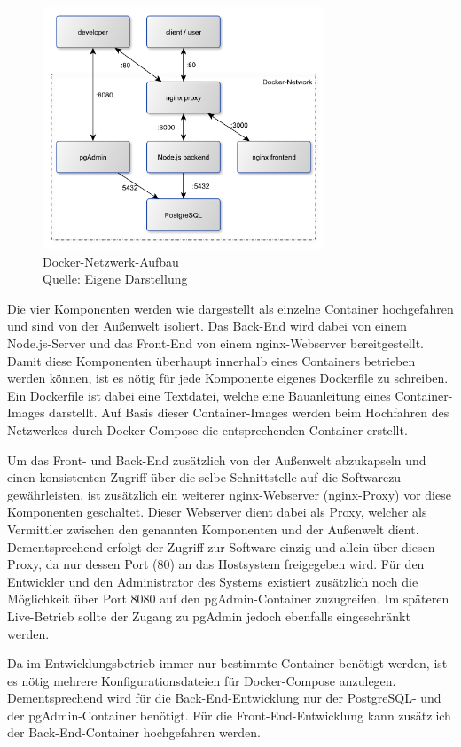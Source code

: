 \begin{figure}[H]
	\centering
	\includegraphics[width=0.75\textwidth]{img/implementierung/network.pdf}
	\captionsetup{justification=centering, format=plain}
	\caption[Docker-Netzwerk-Aufbau]{Docker-Netzwerk-Aufbau \\Quelle: Eigene Darstellung}
	\label{fig:implementierung:docker}
\end{figure}

Die vier Komponenten werden wie dargestellt als einzelne Container hochgefahren und sind von der Außenwelt isoliert. 
Das Back-End wird dabei von einem Node.js-Server und das Front-End von einem nginx-Webserver bereitgestellt.
Damit diese Komponenten überhaupt innerhalb eines Containers betrieben werden können, ist es nötig für jede Komponente eigenes Dockerfile zu schreiben.
Ein Dockerfile ist dabei eine Textdatei, welche eine Bauanleitung eines Container-Images darstellt.
Auf Basis dieser Container-Images werden beim Hochfahren des Netzwerkes durch Docker-Compose die entsprechenden Container erstellt.

Um das Front- und Back-End zusätzlich von der Außenwelt abzukapseln und einen konsistenten Zugriff über die selbe Schnittstelle auf die Softwarezu gewährleisten, ist zusätzlich ein weiterer nginx-Webserver (nginx-Proxy) vor diese Komponenten geschaltet.
Dieser Webserver dient dabei als Proxy, welcher als Vermittler zwischen den genannten Komponenten und der Außenwelt dient.
Dementsprechend erfolgt der Zugriff zur Software einzig und allein über diesen Proxy, da nur dessen Port (80) an das Hostsystem freigegeben wird.
Für den Entwickler und den Administrator des Systems existiert zusätzlich noch die Möglichkeit über Port 8080 auf den pgAdmin-Container zuzugreifen. 
Im späteren Live-Betrieb sollte der Zugang zu pgAdmin jedoch ebenfalls eingeschränkt werden.

Da im Entwicklungsbetrieb immer nur bestimmte Container benötigt werden, ist es nötig mehrere Konfigurationsdateien für Docker-Compose anzulegen.
Dementsprechend wird für die Back-End-Entwicklung nur der PostgreSQL- und der pgAdmin-Container benötigt.
Für die Front-End-Entwicklung kann zusätzlich der Back-End-Container hochgefahren werden.

